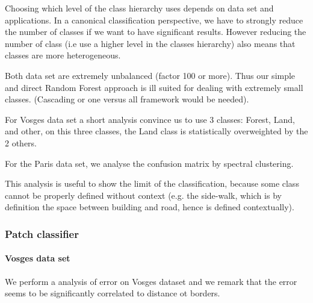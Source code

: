 				Choosing which level of the class hierarchy uses depends on data set and applications.
				In a canonical classification perspective, we have to strongly reduce the number of classes if we want to have significant results.
				However reducing the number of class (i.e use a higher level in the classes hierarchy) also means that classes are more heterogeneous.
				
				Both data set are extremely unbalanced (factor 100 or more). Thus our simple and direct Random Forest approach is ill suited for dealing with extremely small classes. (Cascading or one versus all framework would be needed).
				
				For Vosges data set a short analysis convince us to use 3 classes: Forest, Land, and other, on this three classes, the Land class is statistically overweighted by the 2 others.	
				
				For the Paris data set, we analyse the confusion matrix by spectral clustering.
				
				
				
				This analysis is useful to show the limit of the classification, because some class cannot be properly defined without context (e.g. the side-walk, which is by definition the space between building and road, hence is defined contextually).
		
		\subsubsection{Patch classifier}
			\paragraph{Vosges data set}
		
				We perform a analysis of error on Vosges dataset and we remark that the error seems to be significantly correlated to distance ot borders.
				
				
